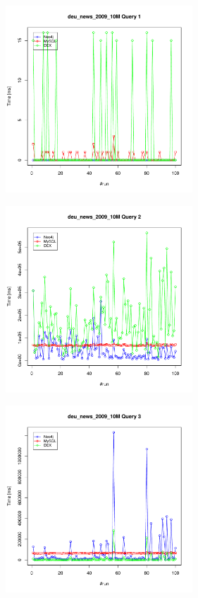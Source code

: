 \documentclass[11pt, a4paper, oneside]{article} %
\begin{document}
\begin{appendix}
\begin{landscape}
\begin{figure}[ht]
		\begin{minipage}[hbt]{6.5cm}
			\centering
			\includegraphics[width=7cm]{../results/cold caches/images/10M_query1_perf}
			\label{fig:10M_query1_perf}
		\end{minipage}
		\hfill
		\begin{minipage}[hbt]{6.5cm}
			\centering
			\includegraphics[width=7cm]{../results/cold caches/images/10M_query2_perf}
			\label{fig:10M_query2_perf}
		\end{minipage}
		\hfill
		\begin{minipage}[hbt]{6.5cm}
			\centering
			\includegraphics[width=7cm]{../results/cold caches/images/10M_query3_perf}
			\label{fig:10M_query3_perf}
		\end{minipage}
	\end{figure}
\end{landscape}


\end{appendix}
\end{document}
